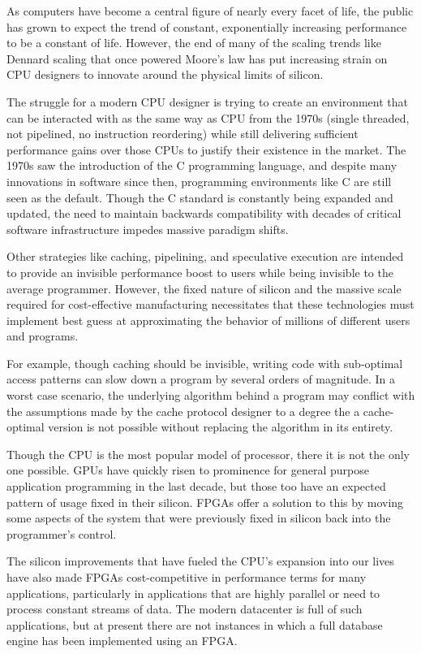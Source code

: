 
As computers have become a central figure of nearly every facet of life, the
public has grown to expect the trend of constant, exponentially increasing
performance to be a constant of life. However, the end of many of the scaling
trends like Dennard scaling that once powered Moore's law has put increasing
strain on CPU designers to innovate around the physical limits of silicon.

The struggle for a modern CPU designer is trying to create an environment that
can be interacted with as the same way as CPU from the 1970s (single threaded,
not pipelined, no instruction reordering) while still delivering sufficient
performance gains over those CPUs to justify their existence in the market. The
1970s saw the introduction of the C programming language, and despite many
innovations in software since then, programming environments like C are still
seen as the default. Though the C standard is constantly being expanded and
updated, the need to maintain backwards compatibility with decades of critical
software infrastructure impedes massive paradigm shifts.

Other strategies like caching, pipelining, and speculative execution are
intended to provide an invisible performance boost to users while being
invisible to the average programmer. However, the fixed nature of silicon and
the massive scale required for cost-effective manufacturing necessitates that
these technologies must implement best guess at approximating the behavior of
millions of different users and programs.

For example, though caching should be invisible, writing code with sub-optimal
access patterns can slow down a program by several orders of magnitude. In a
worst case scenario, the underlying algorithm behind a program may conflict with
the assumptions made by the cache protocol designer to a degree the a
cache-optimal version is not possible without replacing the algorithm in its
entirety.

Though the CPU is the most popular model of processor, there it is not the only
one possible. GPUs have quickly risen to prominence for general purpose
application programming in the last decade, but those too have an expected
pattern of usage fixed in their silicon. FPGAs offer a solution to this by
moving some aspects of the system that were previously fixed in silicon back
into the programmer's control.

The silicon improvements that have fueled the CPU's expansion into our lives
have also made FPGAs cost-competitive in performance terms for many
applications, particularly in applications that are highly parallel or need to
process constant streams of data. The modern datacenter is full of such
applications, but at present there are not instances in which a full database
engine has been implemented using an FPGA.
